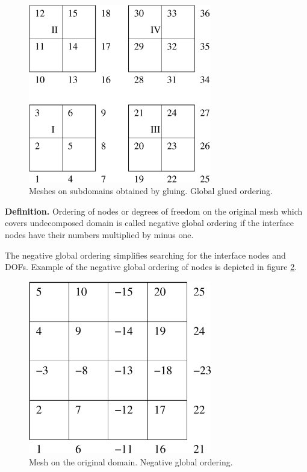\begin{figure}[h]
\begin{center}
\includegraphics[width=80mm]{FIG/meshglobgluedord.eps}
\caption{Meshes on subdomains obtained by gluing. Global glued ordering.}
\label{figmeshglobgluedord}
\end{center}
\end{figure}

\noindent
{\bf Definition.}
Ordering of nodes or degrees of freedom on the original mesh which covers undecomposed domain is called
negative global  ordering if
the interface nodes have their numbers multiplied by minus one.

\noindent
The negative global ordering simplifies searching for the interface nodes and DOFs.
Example of the negative global ordering of nodes is depicted in figure \ref{figmeshnegglobord}.

\begin{figure}[h]
\begin{center}
\includegraphics[width=80mm]{FIG/meshnegglobord.eps}
\caption{Mesh on the original domain. Negative global ordering.}
\label{figmeshnegglobord}
\end{center}
\end{figure}


